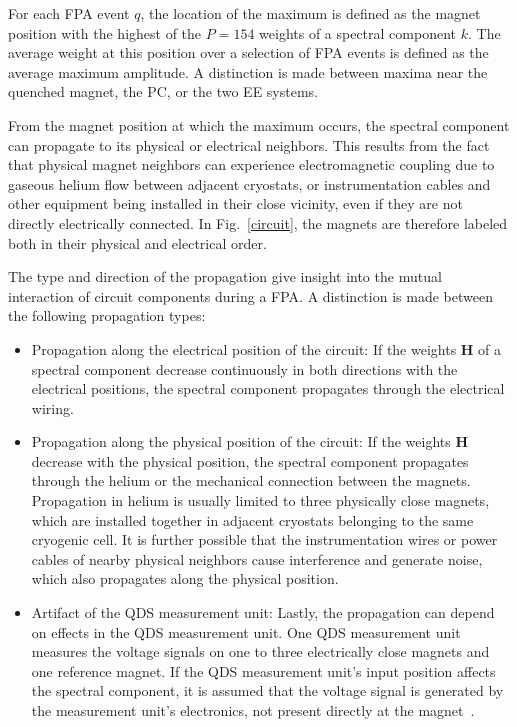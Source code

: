 \documentclass[lettersize,journal]{IEEEtran}
\begin{document}
For each FPA event $q$, the location of the maximum is defined as the magnet position with the highest of the $P=154$ weights of a spectral component $k$.
The average weight at this position over a selection of FPA events is defined as the average maximum amplitude.
A distinction is made between maxima near the quenched magnet, the PC, or the two EE systems.

From the magnet position at which the maximum occurs, the spectral component can propagate to its physical or electrical neighbors.
This results from the fact that physical magnet neighbors can experience electromagnetic coupling due
to gaseous helium flow between adjacent cryostats, or instrumentation cables and other equipment being installed in their close vicinity, even if they are not directly electrically connected.
In Fig.~\ref{circuit}, the magnets are therefore labeled both in their physical and electrical order.

The type and direction of the propagation give insight into the mutual interaction of circuit components during a FPA.
A distinction is made between the following propagation types:
\begin{itemize}
    \item Propagation along the electrical position of the circuit: If the weights $\mathbf{H}$ of a spectral component decrease continuously in both directions with the electrical positions, the spectral component propagates through the electrical wiring.
    \item Propagation along the physical position of the circuit: If the weights $\mathbf{H}$ decrease with the physical position, the spectral component propagates through the helium or the mechanical connection between the magnets. 
    Propagation in helium is usually limited to three physically close magnets, which are installed together in adjacent cryostats belonging to the same cryogenic cell. 
    It is further possible that the instrumentation wires or power cables of nearby physical neighbors cause interference and generate noise, which also propagates along the physical position.
    \item Artifact of the QDS measurement unit: Lastly, the propagation can depend on effects in the QDS measurement unit.
    One QDS measurement unit measures the voltage signals on one to three electrically close magnets and one reference magnet. 
    If the QDS measurement unit's input position affects the spectral component, it is assumed that the voltage signal is generated by the measurement unit's electronics, not present directly at the magnet~\cite{Denz2006,Denz2009}. 
\end{itemize}
\end{document}
